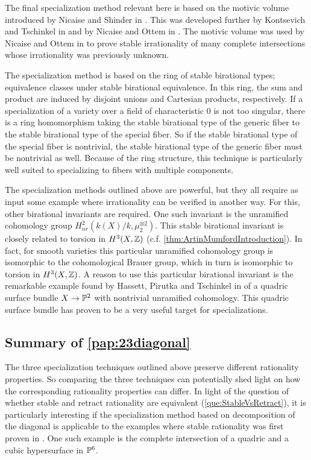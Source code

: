 The final specialization method relevant here is based on the motivic volume introduced by Nicaise and Shinder in \cite{NicaiseShinderMotivic}. This was developed further by Kontsevich and Tschinkel in \cite{KontsevichTschinkelSpecialization} and by Nicaise and Ottem in \cite{NicaiseOttemRefinement}. The motivic volume was used by Nicaise and Ottem in \cite{NicaiseOttem} to prove stable irrationality of many complete intersections whose irrationality was previously unknown.

The specialization method is based on the ring of stable birational types; equivalence classes under stable birational equivalence. In this ring, the sum and product are induced by disjoint unions and Cartesian products, respectively. If a specialization of a variety over a field of characteristic 0 is not too singular, there is a ring homomorphism taking the stable birational type of the generic fiber to the stable birational type of the special fiber. So if the stable birational type of the special fiber is nontrivial, the stable birational type of the generic fiber must be nontrivial as well. Because of the ring structure, this technique is particularly well suited to specializing to fibers with multiple components.

The specialization methods outlined above are powerful, but they all require as input some example where irrationality can be verified in another way. For this, other birational invariants are required. One such invariant is the unramified cohomology group $H_{nr}^2(k(X)/k,\mu_2^{\otimes 2})$. This stable birational invariant is closely related to torsion in $H^3(X,\Z)$ (c.f. \cref{thm:ArtinMumfordIntroduction}). In fact, for smooth varieties this particular unramified cohomology group is isomorphic to the cohomological Brauer group, which in turn is isomorphic to torsion in $H^3(X,\Z)$. A reason to use this particular birational invariant is the remarkable example found by Hassett, Pirutka and Tschinkel in \cite{HPTActa} of a quadric surface bundle $X \to \P^2$ with nontrivial unramified cohomology. This quadric surface bundle has proven to be a very useful target for specializations.

\subsection{Summary of \cref{pap:23diagonal}}
The three specialization techniques outlined above preserve different rationality properties. So comparing the three techniques can potentially shed light on how the corresponding rationality properties can differ. In light of the question of whether stable and retract rationality are equivalent (\cref{que:StableVsRetract}), it is particularly interesting if the specialization method based on decomposition of the diagonal is applicable to the examples where stable rationality was first proven in \cite{NicaiseOttem}. One such example is the complete intersection of a quadric and a cubic hypersurface in $\P^6$.

